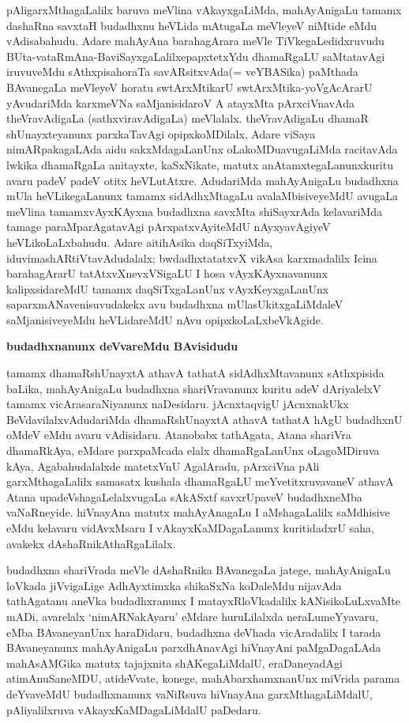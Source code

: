 pAligarxMthagaLalilx baruva meVlina vAkayxgaLiMda, mahAyAnigaLu tamamx dashaRna savxtaH budadhxnu heVLida mAtugaLa meVleyeV niMtide eMdu vAdisabahudu. Adare mahAyAna barahagArara meVle TiVkegaLedidxruvudu BUta-vataRmAna-BaviSayxgaLalilx\break epapxtetxYdu dhamaRgaLU saMtatavAgi iruvuveMdu sAthxpisahoraTa savARsitxvAda\break (= veYBASika) paMthada BAvanegaLa meVleyeV horatu swtArxMtikarU swtArxMtika-\-yoVgAcArarU yAvudariMda karxmeVNa saMjanisidaroV A atayxMta pArxciVnavAda theVravAdigaLa (sathxviravAdigaLa) meVlalalx. theVravAdigaLu dhamaR shUnayxteyanunx parxkaTa\-vAgi opipxkoMDilalx, Adare viSaya nimARpakagaLAda aidu sakxMdagaLanUnx oLakoMDu\break avugaLiMda racitavAda lwkika dhamaRgaLa anitayxte, kaSxNikate, matutx anAtamxtegaLanunx\break kuritu avaru padeV padeV otitx heVLutAtxre. AdudariMda mahAyAnigaLu \hbox{budadhxna} mUla heVLikegaLanunx tamamx sidAdhxMtagaLu avalaMbisiveyeMdU avugaLa meVlina tamamx\break vAyxKAyxna budadhxna savxMta shiSayxrAda kelavariMda tamage paraMparAgatavAgi pArxpatxvAyi\-teMdU nAyxyavAgiyeV heVLikoLaLxbahudu. Adare aitihAsika daqSiTxyiMda, idu\break vimashARtiVtavAdudalalx; bwdadhxtatatxvX vikAsa karxmadalilx Icina barahagArarU tatAtxvXnevxVSigaLU I hosa vAyxKAyxnavanunx kalipxsidareMdU tamamx daqSiTxgaLanUnx vAyxKeyxgaLanUnx saparx\-mANavenisuvudakekx avu budadhxna mUlasUkitxgaLiMdaleV saMjanisiveyeMdu heVLida\-reMdU nAvu opipxkoLaLxbeVkAgide.

\begin{center}
{\textbf{\Large budadhxnanunx deVvareMdu BAvisidudu}}
\end{center}

tamamx dhamaRshUnayxtA athavA tathatA sidAdhxMtavanunx sAthxpisida baLika, mahAyAnigaLu budadhxna shariVravanunx kuritu adeV dAriyalelxV tamamx vicArasaraNiyanunx naDesi\-daru. jAcnxtaqvigU jAcnxnakUkx BeVdavilalxvAdudariMda dhamaRshUnayxtA athavA tathatA hAgU budadhxnU oMdeV eMdu avaru vAdisidaru. Atanobabx tathAgata, Atana shariVra dhamaRkAya, eMdare parxpaMcada elalx dhamaRgaLanUnx oLagoMDiruva kAya, Agabahudalalxde matetxVnU AgalAradu, pArxciVna pAli garxMthagaLalilx samasatx kushala dhamaRgaLU meYvetitxruvavaneV athavA Atana upadeVshagaLelalxvugaLa sAkASxtf savxrUpaveV budadhxneMba vaNaRneyide. hiVnayAna matutx mahAyAnagaLu I aMshagaLalilx saMdhisive eMdu kelavaru vidAvxMsaru I vAkayxKaMDagaLanunx kuritidadxrU saha, avakekx dAshaRnikAthaR\-gaLilalx.

budadhxna shariVrada meVle dAshaRnika BAvanegaLa jatege, mahAyAnigaLu loVkada jiVvigaLige AdhAyxtimxka shikaSxNa koDaleMdu nijavAda tathAgatanu aneVka budadhxranunx I matayxRloVkadalilx kANisikoLuLxvaMte mADi, avarelalx `nimARNakAyaru' eMdare huruLilalxda neraLumeYyavaru, eMba BAvaneyanUnx haraDidaru, budadhxna deVhada vicAradalilx I tarada BAvaneyanunx mahAyAnigaLu parxdhAnavAgi hiVnayAni paMgaDagaLAda mahAsAMGika matutx tajajxnita shAKegaLiMdalU, eraDaneyadAgi atimAnuSaneMDU, atideVvate, konege, mahAbarxhamxnanUnx miVrida parama deYvaveMdU budadhxnanunx vaNiRsuva hiVnayAna garxMthagaLiMdalU, pAliyalilxruva vAkayxKaMDagaLiMdalU paDedaru.

